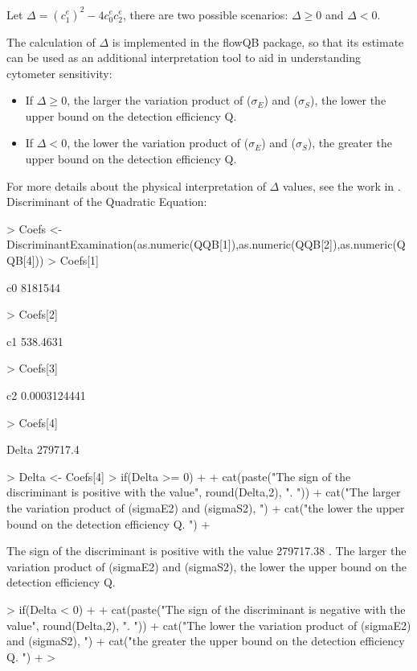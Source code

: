 \documentclass{article}
\begin{document}
Let $\Delta =  (c^{e}_{1})^{2}-4c^{e}_{0}c^{e}_{2}$, there are two possible scenarios: $\Delta \geq 0$ and $\Delta < 0$.

The calculation of $\Delta$ is implemented in the flowQB package, so that its estimate can be used as an additional interpretation tool to aid in understanding cytometer sensitivity:
\begin{itemize}
\item  If $\Delta \geq 0$, the larger the variation product of ($\sigma_{E}$) and ($\sigma_{S}$), the lower the upper bound on the detection efficiency Q.
\item  If $\Delta < 0$, the lower the variation product of ($\sigma_{E}$) and ($\sigma_{S}$), the greater the upper bound on the detection efficiency Q. 
\end{itemize}

For more details about the physical interpretation of $\Delta$ values, see the work in \cite{f}. \\

Discriminant of the Quadratic Equation:

\begin{Schunk}
\begin{Sinput}
> Coefs <- DiscriminantExamination(as.numeric(QQB[1]),as.numeric(QQB[2]),as.numeric(QQB[4]))
> Coefs[1]
\end{Sinput}
     c0 
8181544 \begin{Sinput}
> Coefs[2]
\end{Sinput}
      c1 
538.4631 \begin{Sinput}
> Coefs[3]
\end{Sinput}
          c2 
0.0003124441 \begin{Sinput}
> Coefs[4]
\end{Sinput}
   Delta 
279717.4 \begin{Sinput}
> Delta <- Coefs[4]
> if(Delta >= 0) 
+ {
+ cat(paste("The sign of the discriminant is positive with the value", round(Delta,2), ". "))
+ cat("The larger the variation product of (sigmaE2) and (sigmaS2), ")
+ cat("the lower the upper bound on the detection efficiency Q. ")
+ } 
\end{Sinput}
The sign of the discriminant is positive with the value 279717.38 . The larger the variation product of (sigmaE2) and (sigmaS2), the lower the upper bound on the detection efficiency Q. \begin{Sinput}
> if(Delta < 0) 
+ {
+ cat(paste("The sign of the discriminant is negative with the value", round(Delta,2), ". "))
+ cat("The lower the variation product of (sigmaE2) and (sigmaS2), ")
+ cat("the greater the upper bound on the detection efficiency Q. ")
+ }
> 
\end{Sinput}
\end{Schunk}
\end{document}
